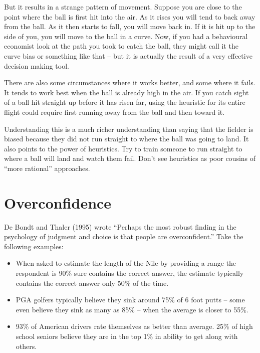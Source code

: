 \documentclass[
  letterpaper,
  DIV=11,
  numbers=noendperiod]{scrreprt}
\begin{document}
But it results in a strange pattern of movement. Suppose you are close
to the point where the ball is first hit into the air. As it rises you
will tend to back away from the ball. As it then starts to fall, you
will move back in. If it is hit up to the side of you, you will move to
the ball in a curve. Now, if you had a behavioural economist look at the
path you took to catch the ball, they might call it the curve bias or
something like that -- but it is actually the result of a very effective
decision making tool.

There are also some circumstances where it works better, and some where
it fails. It tends to work best when the ball is already high in the
air. If you catch sight of a ball hit straight up before it has risen
far, using the heuristic for its entire flight could require first
running away from the ball and then toward it.

Understanding this is a much richer understanding than saying that the
fielder is biased because they did not run straight to where the ball
was going to land. It also points to the power of heuristics. Try to
train someone to run straight to where a ball will land and watch them
fail. Don't see heuristics as poor cousins of ``more rational''
approaches.

\hypertarget{overconfidence}{%
\chapter{Overconfidence}\label{overconfidence}}

De Bondt and Thaler (1995) wrote ``Perhaps the most robust finding in
the psychology of judgment and choice is that people are
overconfident.'' Take the following examples:

\begin{itemize}
\item
  When asked to estimate the length of the Nile by providing a range the
  respondent is 90\% sure contains the correct answer, the estimate
  typically contains the correct answer only 50\% of the time.
\item
  PGA golfers typically believe they sink around 75\% of 6 foot putts --
  some even believe they sink as many as 85\% -- when the average is
  closer to 55\%.
\item
  93\% of American drivers rate themselves as better than average. 25\%
  of high school seniors believe they are in the top 1\% in ability to
  get along with others.
\end{itemize}
\end{document}
